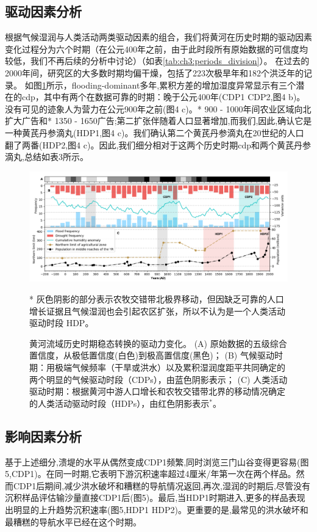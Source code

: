 
\subsection{驱动因素分析}
根据气候湿润与人类活动两类驱动因素的组合，我们将黄河在历史时期的驱动因素变化过程分为六个时期（在公元400年之前，由于此时段所有原始数据的可信度均较低，我们不再后续的分析中讨论）（如表\ref{tab:ch3:periods_division}）。
在过去的2000年间，研究区的大多数时期均偏干燥，包括了223次极旱年和182个洪泛年的记录。
如图\ref{fig:ch3:drivers}所示，flooding-dominant多年,累积方差的增加湿度异常显示有三个潜在的cdp，其中有两个在数据可靠的时期：晚于公元400年(CDP1 CDP2,图4 b)。没有可见的迹象人为营力在公元900年之前(图4 c)。* 900 - 1000年间农业区域向北扩大广告和* 1350 - 1650广告;第二扩张伴随着人口显著增加,而我们,因此,确认它是一种黄芪丹参滴丸(HDP1,图4 c)。我们确认第二个黄芪丹参滴丸在20世纪的人口翻了两番(HDP2,图4 c)。因此,我们细分相对于这两个历史时期cdp和两个黄芪丹参滴丸,总结如表3所示。



\begin{figure}[htb]
    \includegraphics[width=\textwidth]{img/ch3/ch3_drivers.png}
    \caption[黄河流域历史时期稳态转换的驱动力变化]{黄河流域历史时期稳态转换的驱动力变化。
    (A) 原始数据的五级综合置信度，从极低置信度(白色)到极高置信度(黑色)；
    (B) 气候驱动时期：用极端气候频率（干旱或洪水）以及累积湿润度距平共同确定的两个明显的气候驱动时段（CDPs），由蓝色阴影表示；
    (C) 人类活动驱动时期：根据黄河中游人口增长和农牧交错带北界的移动情况确定的人类活动驱动时段（HDPs），由红色阴影表示$^*$。}
    \footnotesize
    * 灰色阴影的部分表示农牧交错带北极界移动，但因缺乏可靠的人口增长证据且气候湿润也会引起农区扩张，所以不认为是一个人类活动驱动时段 HDP。
    \label{fig:ch3:drivers}
\end{figure}

\subsection{影响因素分析}
基于上述细分,溃堤的水平从偶然变成CDP1频繁,同时浏览三门山谷变得更容易(图5,CDP1)。在同一时期,它表明下游沉积速率超过4厘米/年第一次在两个样品。然而CDP1后期间,减少洪水破坏和糟糕的导航情况返回,再次,湿润的时期后,尽管没有沉积样品评估输沙量直接CDP1后(图5)。最后,当HDP1时期进入,更多的样品表现出明显的上升趋势沉积速率(图5,HDP1 HDP2)。更重要的是,最常见的洪水破坏和最糟糕的导航水平已经在这个时期。

